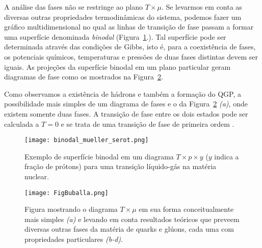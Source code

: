 A análise das fases não se restringe ao plano $T \times \mu$. Se levarmos em conta as diversas outras propriedades termodinâmicas do sistema, podemos fazer um gráfico multidimensional no qual as linhas de transição de fase passam a formar uma superfície denominada \emph{binodal} (Figura~\ref{Fig:binodal}\cite{MuellerSerot}.). Tal superfície pode ser determinada através das condições de Gibbs, isto é, para a coexistência de fases, os potenciais químicos, temperaturas e pressões de duas fases distintas devem ser iguais. As projeções da superfície binodal em um plano particular geram diagramas de fase como os mostrados na Figura~\ref{FigBuballa}\cite{Buballa}.

Como observamos a existência de hádrons e também a formação do QGP, a possibilidade mais simples de um diagrama de fases e o da Figura~\ref{FigBuballa} \emph{(a)}, onde existem somente duas fases. A transição de fase entre os dois estados pode ser calculada a $T = 0$ e se trata de uma transição de fase de primeira ordem \cite{Stephanov2004}. 

\begin{figure}
	\texttt{[image: binodal\_mueller\_serot.png]}
	\caption{Exemplo de superfície binodal em um diagrama $T \times p \times y$ ($y$ indica a fração de prótons) para uma transição líquido-gás na matéria nuclear.}
	\label{Fig:binodal}
\end{figure}

\begin{figure}
	\texttt{[image: FigBuballa.png]}
	\caption{Figura mostrando o diagrama $T\times \mu$ em sua forma conceitualmente mais simples \emph{(a)} e levando em conta resultados teóricos que preveem diversas outras fases da matéria de quarks e glúons, cada uma com propriedades particulares \emph{(b-d)}.}
\label{FigBuballa}
\end{figure}

